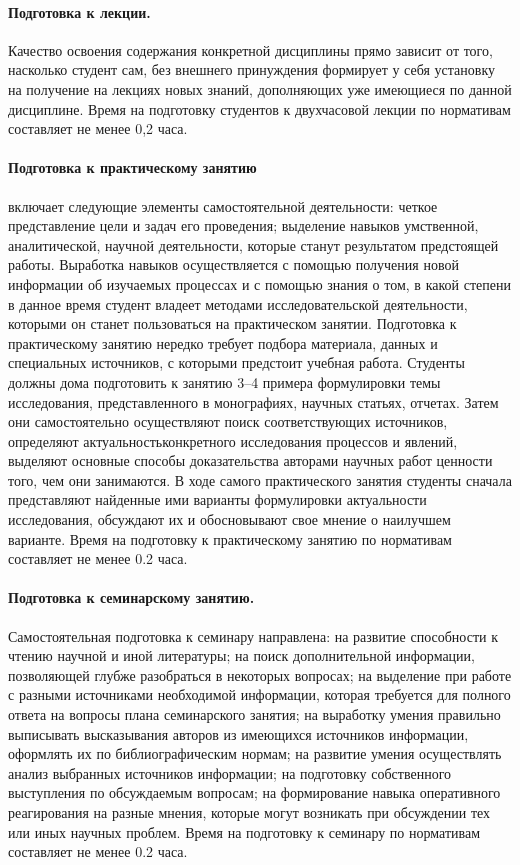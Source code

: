 \documentclass[12pt]{scrartcl}
\begin{document}
\paragraph{Подготовка к лекции.} Качество освоения содержания конкретной дисциплины
прямо зависит от того, насколько студент сам, без внешнего принуждения формирует у
себя установку на получение на лекциях новых знаний, дополняющих уже имеющиеся по
данной дисциплине. Время на подготовку студентов к двухчасовой лекции по нормативам
составляет не менее 0,2 часа.

\paragraph{Подготовка к практическому занятию}
включает следующие элементы самостоятельной деятельности: четкое представление
цели и задач его проведения; выделение навыков умственной, аналитической, научной
деятельности, которые станут результатом предстоящей работы. Выработка навыков
осуществляется с помощью получения новой информации об изучаемых процессах и с
помощью знания о том, в какой степени в данное время студент владеет методами
исследовательской деятельности, которыми он станет пользоваться на практическом
занятии. Подготовка к практическому занятию нередко требует подбора материала,
данных и специальных источников, с которыми предстоит учебная работа. Студенты
должны дома подготовить к занятию 3--4 примера формулировки темы исследования,
представленного в монографиях, научных статьях, отчетах. Затем они самостоятельно
осуществляют поиск соответствующих источников, определяют актуальностьконкретного исследования процессов и явлений, выделяют основные способы
доказательства авторами научных работ ценности того, чем они занимаются. В ходе
самого практического занятия студенты сначала представляют найденные ими варианты
формулировки актуальности исследования, обсуждают их и обосновывают свое мнение о
наилучшем варианте. Время на подготовку к практическому занятию по нормативам
составляет не менее 0.2 часа.

\paragraph{Подготовка к семинарскому занятию.} Самостоятельная подготовка к семинару
направлена: на развитие способности к чтению научной и иной литературы; на поиск
дополнительной информации, позволяющей глубже разобраться в некоторых вопросах; на
выделение при работе с разными источниками необходимой информации, которая
требуется для полного ответа на вопросы плана семинарского занятия; на выработку
умения правильно выписывать высказывания авторов из имеющихся источников
информации, оформлять их по библиографическим нормам; на развитие умения
осуществлять анализ выбранных источников информации; на подготовку собственного
выступления по обсуждаемым вопросам; на формирование навыка оперативного
реагирования на разные мнения, которые могут возникать при обсуждении тех или иных
научных проблем. Время на подготовку к семинару по нормативам составляет не менее
0.2 часа.
\end{document}
